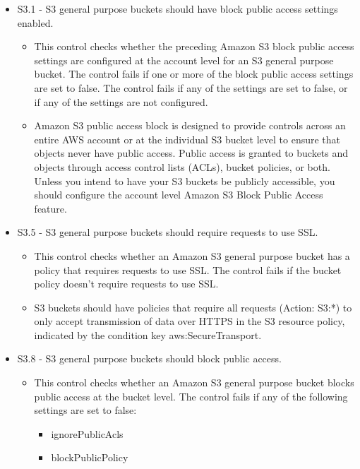 \begin{mdframed}[backgroundcolor=gray!05, linecolor=gray!50]
\itshape
\begin{itemize}
    \item S3.1 - S3 general purpose buckets should have block public access settings enabled.
    \begin{itemize}
        \item This control checks whether the preceding Amazon S3 block public access settings are configured at the account level for an S3 general purpose bucket. The control fails if one or more of the block public access settings are set to false. The control fails if any of the settings are set to false, or if any of the settings are not configured.
        \item Amazon S3 public access block is designed to provide controls across an entire AWS account or at the individual S3 bucket level to ensure that objects never have public access. Public access is granted to buckets and objects through access control lists (ACLs), bucket policies, or both. Unless you intend to have your S3 buckets be publicly accessible, you should configure the account level Amazon S3 Block Public Access feature.
    \end{itemize}
    \item S3.5 - S3 general purpose buckets should require requests to use SSL.
    \begin{itemize}
        \item This control checks whether an Amazon S3 general purpose bucket has a policy that requires requests to use SSL. The control fails if the bucket policy doesn't require requests to use SSL.
        \item S3 buckets should have policies that require all requests (Action: S3:*) to only accept transmission of data over HTTPS in the S3 resource policy, indicated by the condition key aws:SecureTransport.
    \end{itemize}
    \item S3.8 - S3 general purpose buckets should block public access.
    \begin{itemize}
        \item This control checks whether an Amazon S3 general purpose bucket blocks public access at the bucket level. The control fails if any of the following settings are set to false:
        \begin{itemize}
            \item ignorePublicAcls
            \item blockPublicPolicy

\end{itemize}
\end{itemize}
\end{itemize}
\end{mdframed}
